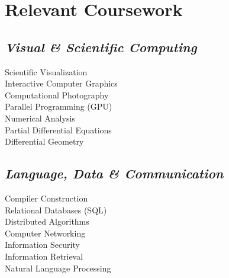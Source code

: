 \documentclass[11pt]{article}
\begin{document}
\begin{minipage}{250pt}
\section*{\sc Relevant Coursework}
\subsection*{\it Visual \& Scientific Computing}
Scientific Visualization\\
Interactive Computer Graphics\\
Computational Photography\\
Parallel Programming (GPU)\\
Numerical Analysis\\
Partial Differential Equations\\
Differential Geometry

\subsection*{\it Language, Data \& Communication}
Compiler Construction\\
Relational Databases (SQL)\\
Distributed Algorithms\\
Computer Networking\\
Information Security\\
Information Retrieval\\
Natural Language Processing

\end{minipage}
\end{document}
